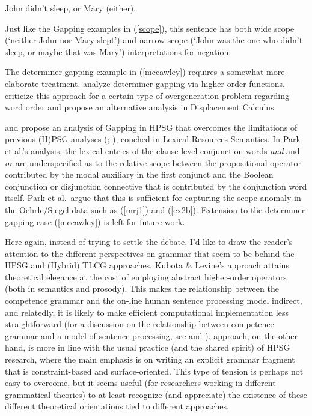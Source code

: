 \documentclass[output=paper,biblatex,babelshorthands,newtxmath,draftmode,colorlinks,citecolor=brown]{langscibook}
\begin{document}
\begin{exe}
 \ex   John didn't sleep, or Mary (either).
\end{exe}
\largerpage%
Just like the Gapping examples in (\ref{scope}), this sentence has
both wide scope (`neither John nor Mary slept') and narrow scope
(`John was the one who didn't sleep, or maybe that was Mary')
interpretations for negation.

The determiner gapping example in (\ref{mccawley}) requires a somewhat more
elaborate treatment. \citet{kubota-levine-gapping} analyze determiner
gapping via higher-order functions. \citet{morrillvalentin16} criticize this
approach for a certain type of overgeneration problem regarding word
order and propose an alternative analysis in Displacement Calculus.

\citet{parkea18gapping} and \citet{parkDiss} propose an analysis of Gapping in HPSG that overcomes
the limitations of previous (H)PSG analyses (\citealt[Section~4.3]{sgww};
\citealt{chaves05,abeille-ea}), couched in Lexical Resources Semantics.  In Park et al.'s analysis,
the lexical entries of the clause-level conjunction words \textit{and} and \textit{or} are
underspecified as to the relative scope between the propositional operator contributed by the modal
auxiliary in the first conjunct and the Boolean conjunction or disjunction connective that is
contributed by the conjunction word itself. Park et al.\ argue that this is sufficient for capturing
the scope anomaly in the Oehrle/Siegel data such as (\ref{mrj1}) and (\ref{ex2b}). Extension to the
determiner gapping case (\ref{mccawley}) is left for future work.

Here again, instead of trying to settle the debate, I'd like to draw
the reader's attention to the different perspectives on grammar that
seem to be behind the HPSG and (Hybrid) TLCG approaches. Kubota \&
Levine's approach attains \pagebreak{}theoretical elegance at the cost of
employing abstract higher-order operators (both in semantics and
prosody). This makes the relationship between the competence grammar
and the on-line human sentence processing model indirect, and
relatedly, it is likely to make efficient computational implementation
less straightforward (for a discussion on the relationship between
competence grammar and a model of sentence processing, see
 and ).
 approach, on the 
other hand, is more in line with the usual practice (and the shared
spirit) of HPSG research, where the main emphasis is on writing an
explicit grammar fragment that is constraint-based and
surface-oriented. This type of tension is perhaps not easy to
overcome, but it seems useful (for researchers working in different
grammatical theories) to at least recognize (and appreciate) the
existence of these different theoretical orientations tied to
different approaches.%
\end{document}
